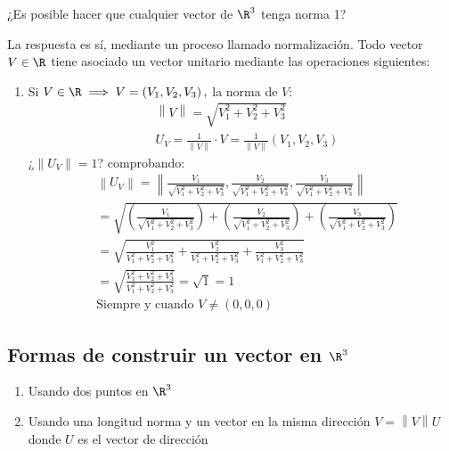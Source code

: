 ¿Es posible hacer que cualquier vector de $\R^3$ tenga norma 1?

La respuesta es sí, mediante un proceso llamado normalización. Todo vector $V\in \R$ tiene asociado un vector unitario mediante las operaciones siguientes:

\begin{enumerate}
	\item Si $V\in \R\implies V=\left(V_1,V_2,V_3\right),$ la norma de $V$:
	      \begin{align}
		       & \left\lVert V \right\rVert=\sqrt{V_1^2+V_2^2+V_3^2}                                                          \\
		       & U_V=\frac{1}{\left\lVert V \right\rVert}\cdot V=\frac{1}{\left\lVert V \right\rVert}\left(V_1,V_2,V_3\right)
	      \end{align}
	      ¿$\left\lVert U_V \right\rVert=1$? comprobando:
	      \begin{align*}
		       & \left\lVert U_V \right\rVert= \left\lVert \frac{V_1}{\sqrt{V_1^2+V_2^2+V_3^2}},\frac{V_2}{\sqrt{V_1^2+V_2^2+V_3^2}},\frac{V_3}{\sqrt{V_1^2+V_2^2+V_3^2}} \right\rVert \\
		       & =\sqrt{\left(\frac{V_1}{\sqrt{V_1^2+V_2^2+V_3^2}}\right)+\left(\frac{V_2}{\sqrt{V_1^2+V_2^2+V_3^2}}\right)+\left(\frac{V_3}{\sqrt{V_1^2+V_2^2+V_3^2}}\right)}         \\
		       & =\sqrt{\frac{V^2_1}{V_1^2+V_2^2+V_3^2}+\frac{V^2_2}{V_1^2+V_2^2+V_3^2}+\frac{V^2_3}{V_1^2+V_2^2+V_3^2}}                                                               \\
		       & =\sqrt{\frac{V_1^2+V_2^2+V_3^2}{V_1^2+V_2^2+V_3^2}}=\sqrt{1}=1                                                                                                        \\
		       & \text{Siempre y cuando }V\neq (0,0,0)
	      \end{align*}
\end{enumerate}

\subsection{Formas de construir un vector en $\R^3$}

\begin{enumerate}
	\item Usando dos puntos en $\R^3$
	\item Usando una longitud norma y un vector en la misma dirección $V=\left\lVert V \right\rVert U$ donde $U$ es el vector de dirección
\end{enumerate}


